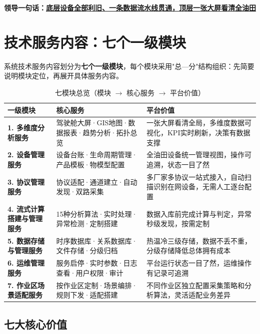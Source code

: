 \documentclass[11pt,a4paper]{ctexart}
\begin{document}
\begin{center}
\large\bfseries 领导一句话：\underline{底层设备全部利旧、一条数据流水线贯通，顶层一张大屏看清全油田}
\end{center}

\section{技术服务内容：七个一级模块}

系统技术服务内容划分为\textbf{七个一级模块}，每个模块采用"总—分"结构组织：先简要说明模块定位，再展开具体服务内容。

\begin{table}[H]\centering
\caption{七模块总览（模块 $\rightarrow$ 核心服务 $\rightarrow$ 平台价值）}
\begin{tabular}{p{2.2cm} p{3.8cm} p{7.5cm}}
\toprule
\textbf{一级模块} & \textbf{核心服务} & \textbf{平台价值} \\
\midrule
\textbf{1. 多维度分析服务} & 驾驶舱大屏·GIS地图·数据报表·趋势分析·拓扑总览 & 一张大屏看清全局，多维度数据可视化，KPI实时刷新，决策有数据支撑 \\
\textbf{2. 设备管理服务} & 设备台账·生命周期管理·产品模板·物模型配置 & 全油田设备统一管理视图，操作可追溯，状态一目了然 \\
\textbf{3. 协议管理服务} & 协议适配·通道建立·自动发现·双路采集 & 多厂家多协议一站式接入，自动扫描识别在网设备，无需人工逐台配置 \\
\textbf{4. 流式计算搭建与管理服务} & 15种分析算法·实时处理·异常检测·定制搭建 & 数据入库前完成计算与判定，异常秒级发现，按需定制 \\
\textbf{5. 数据存储与管理服务} & 时序数据库·关系数据库·文件存储·分级归档 & 热温冷三级存储，数据不丢不重，分级存储降低总体拥有成本 \\
\textbf{6. 运维管理服务} & 服务启停·实时参数·日志查看·用户权限·审计 & 平台运行状态一目了然，运维操作有记录可追溯 \\
\textbf{7. 作业区场景适配服务} & 按作业区定制·场景编排·规则下发·适配搭建 & 不同作业区独立配置采集策略和分析算法，灵活适配业务差异 \\
\bottomrule
\end{tabular}
\end{table}

\subsection{七大核心价值}
\end{document}

